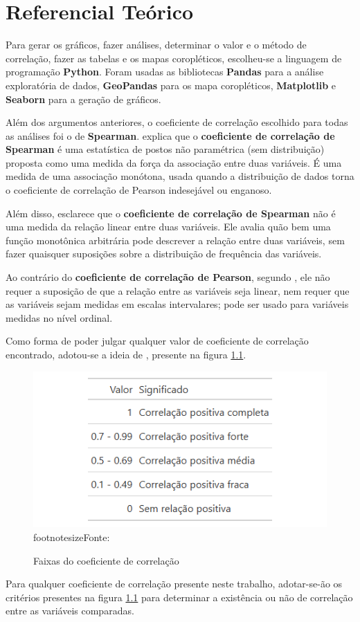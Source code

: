 \chapter{Referencial Teórico}

Para gerar os gráficos, fazer análises, determinar o valor e o método de correlação, fazer as tabelas e os mapas coropléticos, escolheu-se a linguagem de programação \textbf{Python}. Foram usadas as bibliotecas \textbf{Pandas} para a análise exploratória de dados, \textbf{GeoPandas} para os mapa coropléticos, \textbf{Matplotlib} e \textbf{Seaborn} para a geração  de gráficos.

Além dos argumentos anteriores, o coeficiente de correlação escolhido para todas as análises foi o de \textbf{Spearman}. \cite{hauke2011comparison} explica que o \textbf{coeficiente de correlação de Spearman} é uma estatística de postos não paramétrica (sem distribuição) proposta como uma medida da força da associação entre duas variáveis. É uma medida de uma associação monótona, usada quando a distribuição de dados torna o coeficiente de correlação de Pearson indesejável ou enganoso. 

Além disso, \cite{hauke2011comparison} esclarece que o \textbf{coeficiente de correlação de Spearman} não é uma medida da relação linear entre duas variáveis. Ele avalia quão bem uma função monotônica arbitrária pode descrever a relação entre duas variáveis, sem fazer quaisquer suposições sobre a distribuição de frequência das variáveis.

Ao contrário do \textbf{coeficiente de correlação de Pearson}, segundo \cite{hauke2011comparison}, ele não requer a suposição de que a relação entre as variáveis seja linear, nem requer que as variáveis sejam medidas em escalas intervalares; pode ser usado para variáveis medidas no nível ordinal.

Como forma de poder julgar qualquer valor de coeficiente de correlação encontrado, adotou-se a ideia de \cite{ali2022spearman}, presente na figura \ref{fig:faixas_correlacao}.

\begin{figure}[H]
    \centering
    \caption{Faixas do coeficiente de correlação}
    \includegraphics[width=0.5\linewidth]{figuras/tabela_faixas_correlacao}
    \label{fig:faixas_correlacao}
    \\ footnotesize{Fonte: \cite{ali2022spearman}}
\end{figure}

Para qualquer coeficiente de correlação presente neste trabalho, adotar-se-ão os critérios presentes na figura \ref{fig:faixas_correlacao} para determinar a existência ou não de correlação entre as variáveis comparadas.